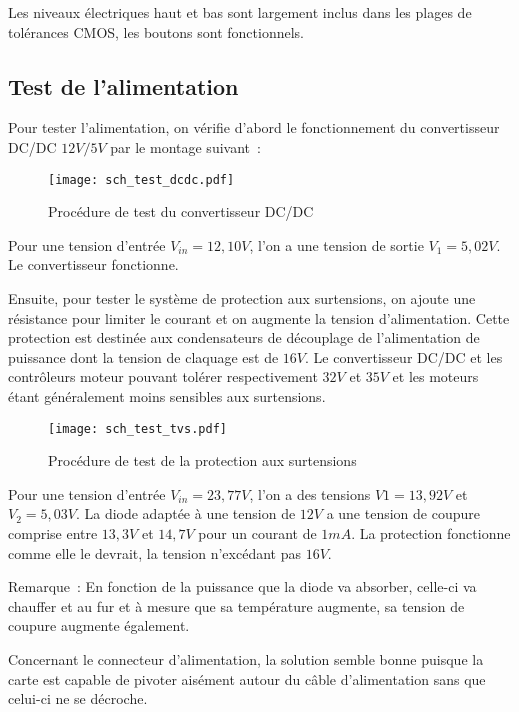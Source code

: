 \vspace{1cm}

Les niveaux électriques haut et bas sont largement inclus dans les plages de tolérances CMOS, les boutons sont fonctionnels.

\subsection{Test de l'alimentation}

Pour tester l'alimentation, on vérifie d'abord le fonctionnement du convertisseur DC/DC $12V/5V$ par le montage suivant~:

\begin{figure}[H]
    \centering
    \texttt{[image: sch\_test\_dcdc.pdf]}
    \decoRule
    \caption[
    Procédure de test du convertisseur DC/DC]{
    Procédure de test du convertisseur DC/DC}
    \label{fig:Procédure de test du convertisseur DC/DC}
	\end{figure}

\vspace{1cm}

Pour une tension d'entrée $V_{in}=12,10V$, l'on a une tension de sortie $V_{1}=5,02V$. Le convertisseur fonctionne.

\vspace{1cm}

Ensuite, pour tester le système de protection aux surtensions, on ajoute une résistance pour limiter le courant et on augmente la tension d'alimentation. Cette protection est destinée aux condensateurs de découplage de l'alimentation de puissance dont la tension de claquage est de $16V$. Le convertisseur DC/DC et les contrôleurs moteur pouvant tolérer respectivement $32V$ et $35V$ et les moteurs étant généralement moins sensibles aux surtensions.

\begin{figure}[H]
    \centering
    \texttt{[image: sch\_test\_tvs.pdf]}
    \decoRule
    \caption[
    Procédure de test de la protection aux surtensions]{
    Procédure de test de la protection aux surtensions}
    \label{fig:Procédure de test de la protection aux surtensions}
	\end{figure}

\vspace{1cm}

Pour une tension d'entrée $V_{in}=23,77V$, l'on a des tensions $V{1}=13,92V$ et $V_{2}=5,03V$. La diode adaptée à une tension de $12V$ a une tension de coupure comprise entre $13,3V$ et $14,7V$ pour un courant de $1mA$. La protection fonctionne comme elle le devrait, la tension n'excédant pas $16V$.

Remarque~: En fonction de la puissance que la diode va absorber, celle-ci va chauffer et au fur et à mesure que sa température augmente, sa tension de coupure augmente également.

\vspace{1cm}

Concernant le connecteur d'alimentation, la solution semble bonne puisque la carte est capable de pivoter aisément autour du câble d'alimentation sans que celui-ci ne se décroche.

